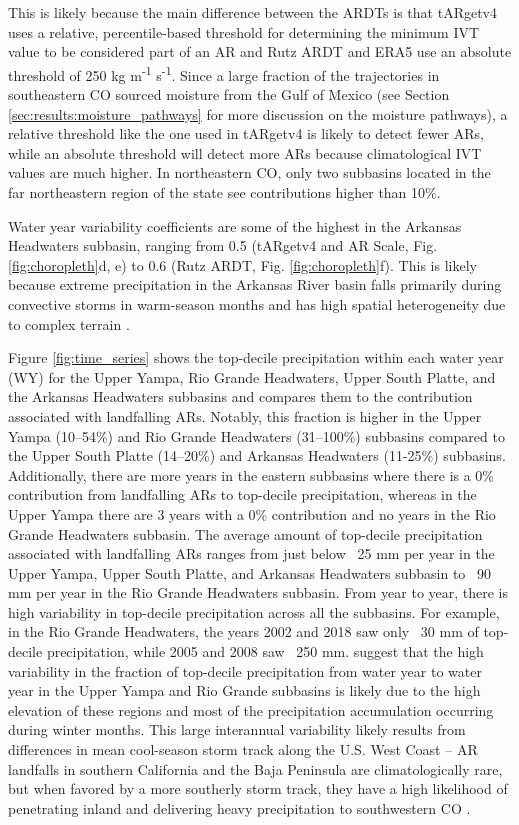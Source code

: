\documentclass[draft]{agujournal2019}
\begin{document}
This is likely because the main difference between the ARDTs is that tARgetv4 uses a relative, percentile-based threshold for determining the minimum IVT value to be considered part of an AR and Rutz ARDT and ERA5 use an absolute threshold of 250 kg m\textsuperscript{-1} s\textsuperscript{-1}. Since a large fraction of the trajectories in southeastern CO sourced moisture from the Gulf of Mexico (see Section \ref{sec:results:moisture_pathways} for more discussion on the moisture pathways), a relative threshold like the one used in tARgetv4 is likely to detect fewer ARs, while an absolute threshold will detect more ARs because climatological IVT values are much higher. In northeastern CO, only two subbasins located in the far northeastern region of the state see contributions higher than 10\%. 

Water year variability coefficients are some of the highest in the Arkansas Headwaters subbasin, ranging from 0.5 (tARgetv4 and AR Scale, Fig. \ref{fig:choropleth}d, e) to 0.6 (Rutz ARDT, Fig. \ref{fig:choropleth}f). This is likely because extreme precipitation in the Arkansas River basin falls primarily during convective storms in warm-season months and has high spatial heterogeneity due to complex terrain \cite{Javier2007ClimatologyBasin}.

Figure \ref{fig:time_series} shows the top-decile precipitation within each water year (WY) for the Upper Yampa, Rio Grande Headwaters, Upper South Platte, and the Arkansas Headwaters subbasins and compares them to the contribution associated with landfalling ARs. Notably, this fraction is higher in the Upper Yampa (10--54\%) and Rio Grande Headwaters (31--100\%) subbasins compared to the Upper South Platte (14--20\%) and Arkansas Headwaters (11-25\%) subbasins. Additionally, there are more years in the eastern subbasins where there is a 0\% contribution from landfalling ARs to top-decile precipitation, whereas in the Upper Yampa there are 3 years with a 0\% contribution and no years in the Rio Grande Headwaters subbasin. The average amount of top-decile precipitation associated with landfalling ARs ranges from just below ~25 mm per year in the Upper Yampa, Upper South Platte, and Arkansas Headwaters subbasin to ~90 mm per year in the Rio Grande Headwaters subbasin. From year to year, there is high variability in top-decile precipitation across all the subbasins. For example, in the Rio Grande Headwaters, the years 2002 and 2018 saw only ~30 mm of top-decile precipitation, while 2005 and 2008 saw ~250 mm.  suggest that the high variability in the fraction of top-decile precipitation from water year to water year in the Upper Yampa and Rio Grande subbasins is likely due to the high elevation of these regions and most of the precipitation accumulation occurring during winter months. This large interannual variability likely results from differences in mean cool-season storm track along the U.S. West Coast – AR landfalls in southern California and the Baja Peninsula are climatologically rare, but when favored by a more southerly storm track, they have a high likelihood of penetrating inland and delivering heavy precipitation to southwestern CO \cite{Rutz2014, Rutz2015}.
\end{document}
